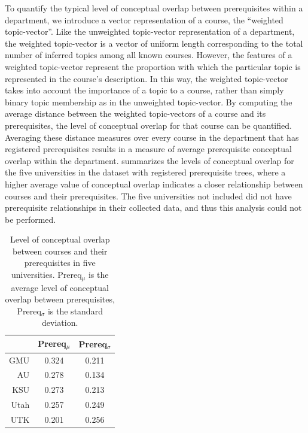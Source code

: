 To quantify the typical level of conceptual overlap between prerequisites within a department, we introduce a vector representation of a course, the ``weighted topic-vector''.
Like the unweighted topic-vector representation of a department, the weighted topic-vector is a vector of uniform length corresponding to the total number of inferred topics among all known courses.
However, the features of a weighted topic-vector represent the proportion with which the particular topic is represented in the course's description.
In this way, the weighted topic-vector takes into account the importance of a topic to a course, rather than simply binary topic membership as in the unweighted topic-vector.
By computing the average distance between the weighted topic-vectors of a course and its prerequisites, the level of conceptual overlap for that course can be quantified.
Averaging these distance measures over every course in the department that has registered prerequisites results in a measure of average prerequisite conceptual overlap within the department.
 summarizes the levels of conceptual overlap for the five universities in the dataset with registered prerequisite trees, where a higher average value of conceptual overlap indicates a closer relationship between courses and their prerequisites.
The five universities not included did not have prerequisite relationships in their collected data, and thus this analysis could not be performed.


\begin{table}
  \centering
  \begin{tabular}{rcc}
    \toprule
     & Prereq$_\mu$ & Prereq$_\sigma$ \\
    \midrule
    GMU  & 0.324 & 0.211 \\
    AU   & 0.278 & 0.134 \\
    KSU  & 0.273 & 0.213 \\
    Utah & 0.257 & 0.249 \\
    UTK  & 0.201 & 0.256 \\
    \bottomrule
  \end{tabular}
  \caption{Level of conceptual overlap between courses and their prerequisites in five universities. Prereq$_\mu$ is the average level of conceptual overlap between prerequisites, Prereq$_\sigma$ is the standard deviation.\label{tbl:prereq-topic-overlap}}
\end{table}

